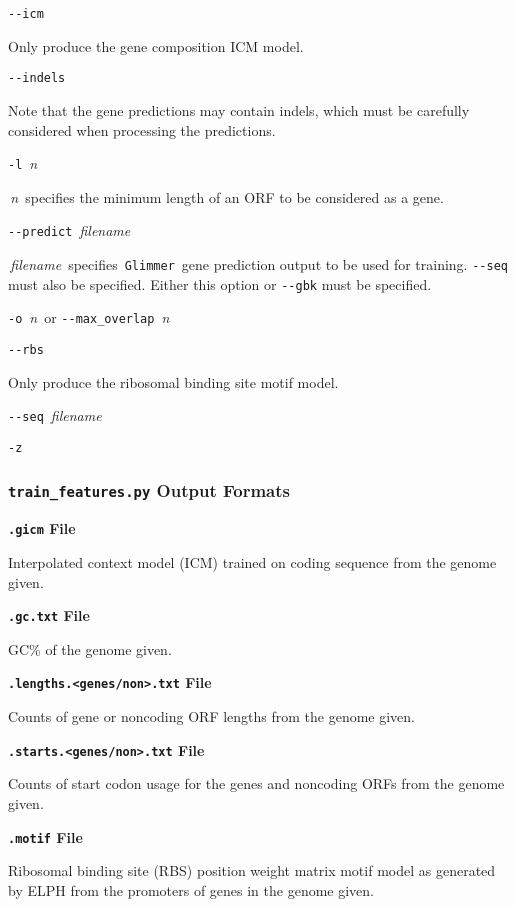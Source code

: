 \documentclass[fleqn,titlepage,11pt]{article}
\def\Desc#1{\,\mbox{\emph{#1}}\,}
\def\Pg#1{\texttt{#1}}
\begin{document}
\exdent
  \verb`--icm`

  Only produce the gene composition ICM model.

\exdent
  \verb`--indels`

  Note that the gene predictions may contain indels, which must be
  carefully considered when processing the predictions.

\exdent
  \verb`-l` \Desc{n}

  \Desc{n} specifies the minimum length of an ORF to be considered
  as a gene.

\exdent
  \verb`--predict` \Desc{filename}

  \Desc{filename} specifies \,\Pg{Glimmer}\, gene prediction output to
  be used for training. \verb`--seq` must also be specified. Either
  this option or \verb`--gbk` must be specified.

\exdent
  \verb`-o` \Desc{n} \enskip or \enskip \verb`--max_overlap` \Desc{n}

\exdent
  \verb`--rbs`

  Only produce the ribosomal binding site motif model.

\exdent
  \verb`--seq` \Desc{filename}

\exdent
  \verb`-z`

\el

\subsubsection{\Pg{train\_features.py} Output Formats}

\smallskip
\noindent\textbf{\Pg{.gicm} File}
\smallskip

Interpolated context model (ICM) trained on coding sequence from the
genome given.

\smallskip
\noindent\textbf{\Pg{.gc.txt} File}
\smallskip

GC\% of the genome given.

\smallskip
\noindent\textbf{\Pg{.lengths.<genes/non>.txt} File}
\smallskip

Counts of gene or noncoding ORF lengths from the genome given.

\smallskip
\noindent\textbf{\Pg{.starts.<genes/non>.txt} File}
\smallskip

Counts of start codon usage for the genes and noncoding ORFs
from the genome given.

\smallskip
\noindent\textbf{\Pg{.motif} File}
\smallskip

Ribosomal binding site (RBS) position weight matrix motif model
as generated by ELPH from the promoters of genes in the genome
given.
\end{document}
